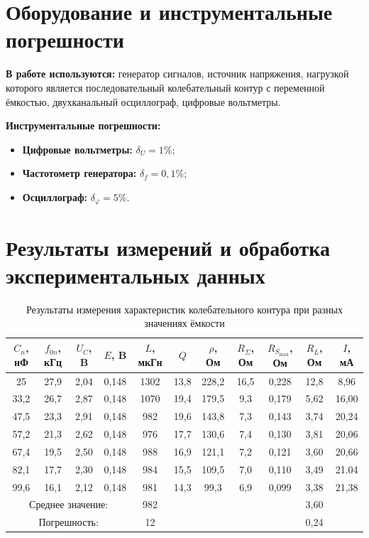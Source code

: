 \documentclass[a4paper,12pt]{article} %
\begin{document}
\section{Оборудование и инструментальные погрешности}

\textbf{В работе используются:} генератор сигналов, источник напряжения,
нагрузкой которого является последовательный колебательный контур с
переменной ёмкостью, двухканальный осциллограф, цифровые вольтметры.

\textbf{Инструментальные погрешности:}
\begin{itemize}
    \item \textbf{Цифровые вольтметры:} $\delta_U = 1\%$;
    \item \textbf{Частотометр генератора:} $\delta_{f} = 0,1\%$;
    \item \textbf{Осциллограф:} $\delta_\varphi = 5\%$.
\end{itemize}

\section{Результаты измерений и обработка экспериментальных данных}

\begin{table}[h]
    \centering
    \begin{tabular}{|c|c|c|c|c|c|c|c|c|c|c|} \hline
        $C_n$, нФ & $f_{0n}$, кГц & $U_C$, B & $E$, B & $L$, мкГн & $Q$ & $\rho$, Ом & $R_\Sigma$, Ом & $R_{S_\text{max}}$, Ом & $R_L$, Ом & $I$, мА \\ \hline  
        25   & 27,9 & 2,04 & 0,148 & 1302 & 13,8 & 228,2 & 16,5 & 0,228 & 12,8 &  8,96 \\ \hline 
        33,2 & 26,7 & 2,87 & 0,148 & 1070 & 19,4 & 179,5 &  9,3 & 0,179 & 5,62 & 16,00 \\ \hline
        47,5 & 23,3 & 2,91 & 0,148 &  982 & 19,6 & 143,8 &  7,3 & 0,143 & 3,74 & 20,24 \\ \hline
        57,2 & 21,3 & 2,62 & 0,148 &  976 & 17,7 & 130,6 &  7,4 & 0,130 & 3,81 & 20,06 \\ \hline
        67,4 & 19,5 & 2,50 & 0,148 &  988 & 16,9 & 121,1 &  7,2 & 0,121 & 3,60 & 20,66 \\ \hline
        82,1 & 17,7 & 2,30 & 0,148 &  984 & 15,5 & 109,5 &  7,0 & 0,110 & 3,49 & 21.04 \\ \hline
        99,6 & 16,1 & 2,12 & 0,148 &  981 & 14,3 &  99,3 &  6,9 & 0,099 & 3,38 & 21,38 \\
        \hline
        \multicolumn{4}{|c|}{Среднее значение:} & 982 & & & & & 3,60 & \\ \hline
        \multicolumn{4}{|c|}{Погрешность:} &  12 & & & & & 0,24 & \\ \hline
    \end{tabular}
    \caption{Результаты измерения характеристик колебательного контура при разных значениях ёмкости}
    \label{tab:results}
\end{table}
\end{document}
